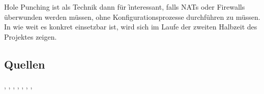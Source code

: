Hole Punching ist als Technik dann für \f interessant, falls NATs
oder Firewalls überwunden werden müssen, ohne Konfigurationsprozesse
durchführen zu müssen. In wie weit es konkret einsetzbar ist, wird
sich im Laufe der zweiten Halbzeit des Projektes zeigen.


\subsection{Quellen} 
\cite{rfc3027},
\cite{rfc3489},
\cite{rfc5389},
\cite{tunnel-p2pnat},
\cite{tunnel-skype},
\cite{tunnel-nat-traversal},
\cite{en-wiki:udp-hole},
\cite{en-wiki:nat-hole}
